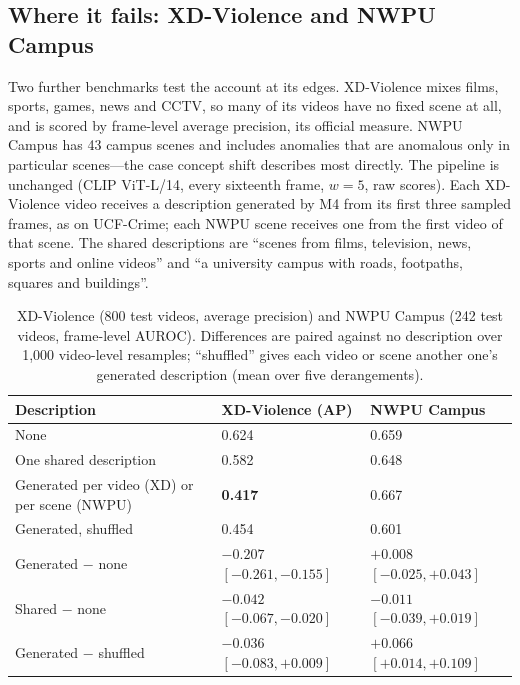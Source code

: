 \documentclass[a4paper,fleqn]{cas-sc}
\begin{document}
\subsection{Where it fails: XD-Violence and NWPU Campus}
\label{sec:res-xd}
Two further benchmarks test the account at its edges. XD-Violence
\citep{wu2020xdviolence} mixes films, sports, games, news and CCTV, so many of its
videos have no fixed scene at all, and is scored by frame-level average precision,
its official measure. NWPU Campus \citep{cao2023nwpu} has 43 campus scenes and
includes anomalies that are anomalous only in particular scenes---the case concept
shift describes most directly. The pipeline is unchanged (CLIP ViT-L/14, every
sixteenth frame, $w{=}5$, raw scores). Each XD-Violence video receives a description
generated by M4 from its first three sampled frames, as on UCF-Crime; each NWPU scene
receives one from the first video of that scene. The shared descriptions are
``scenes from films, television, news, sports and online videos'' and ``a university
campus with roads, footpaths, squares and buildings''.

\begin{table}[width=\linewidth,cols=3,pos=htbp]
\caption{XD-Violence (800 test videos, average precision) and NWPU Campus (242 test
videos, frame-level AUROC). Differences are paired against no description over
1{,}000 video-level resamples; ``shuffled'' gives each video or scene another one's
generated description (mean over five derangements).}\label{tbl:xdnwpu}
\begin{tabularx}{\linewidth}{@{}Z l l@{}}
\toprule
\textbf{Description} & \textbf{XD-Violence (AP)} & \textbf{NWPU Campus} \\
\midrule
None & 0.624 & 0.659 \\
One shared description & 0.582 & 0.648 \\
Generated per video (XD) or per scene (NWPU) & \textbf{0.417} & 0.667 \\
Generated, shuffled & 0.454 & 0.601 \\
\midrule
Generated $-$ none & $-0.207$ $[-0.261, -0.155]$ & $+0.008$ $[-0.025, +0.043]$ \\
Shared $-$ none & $-0.042$ $[-0.067, -0.020]$ & $-0.011$ $[-0.039, +0.019]$ \\
Generated $-$ shuffled & $-0.036$ $[-0.083, +0.009]$ & $+0.066$ $[+0.014, +0.109]$ \\
\bottomrule
\end{tabularx}
\end{table}
\end{document}
